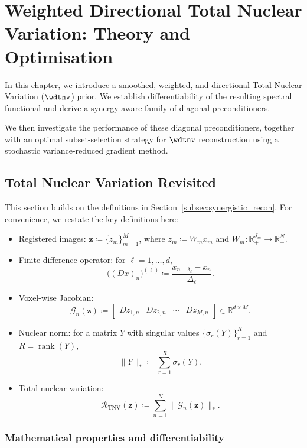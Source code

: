 \chapter{Weighted Directional Total Nuclear Variation: Theory and Optimisation}
\label{chapter:wdtnv}

In this chapter, we introduce a smoothed, weighted, and directional Total Nuclear Variation ($\wdtnv$) prior. We establish differentiability of the resulting spectral functional and derive a synergy-aware family of diagonal preconditioners.

We then investigate the performance of these diagonal preconditioners, together with an optimal subset-selection strategy for $\wdtnv$ reconstruction using a stochastic variance-reduced gradient method.

\section{Total Nuclear Variation Revisited}
\label{sec:tv_to_tnv}

This section builds on the definitions in Section~\ref{subsec:synergistic_recon}. For convenience, we restate the key definitions here:
\begin{itemize}
    \item Registered images: $\bm{z} \coloneqq \{ z_m \}_{m=1}^{M}$, where $z_m \coloneqq W_m x_m$ and
    $W_m : \mathbb{R}_+^{J_m} \to \mathbb{R}_+^{N}$.
    \item Finite-difference operator: for $\ell=1,\dots,d$,
    \[
        \big((D x)_n\big)^{(\ell)} \coloneqq \frac{x_{n+\delta_\ell} - x_{n}}{\Delta_{\ell}} .
    \]
    \item Voxel-wise Jacobian:
    \[
        \mathcal{G}_n(\bm{z})
        \coloneqq
        \begin{bmatrix}
        D z_{1,n} & D z_{2,n} & \cdots & D z_{M,n}
        \end{bmatrix}
        \in \mathbb{R}^{d\times M}.
    \]
    \item Nuclear norm: for a matrix $Y$ with singular values $\{\sigma_r(Y)\}_{r=1}^{R}$ and $R=\operatorname{rank}(Y)$,
    \[
        \|Y\|_* \coloneqq \sum_{r=1}^{R}\sigma_r(Y).
    \]
    \item Total nuclear variation:
    \[
        \mathcal{R}_{\mathrm{TNV}}(\bm{z}) \coloneqq \sum_{n=1}^N  \|\mathcal{G}_n(\bm{z})\|_* .
    \]
\end{itemize}


\subsection{Mathematical properties and differentiability}
\label{subsec:tnv_differentiability}

